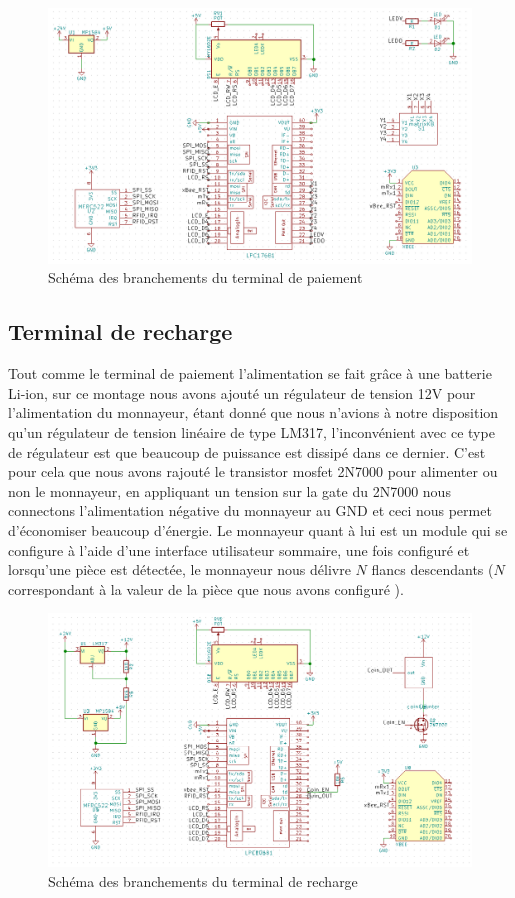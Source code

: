 	\begin{figure}[p]
		\includegraphics[width=\textwidth]{Pictures/Branchements/Terminal_Paiement}
		\caption{Schéma des branchements du terminal de paiement}
		\label{fig.branchPaiement}
	\end{figure}
		
	\subsection{Terminal de recharge}
	Tout comme le terminal de paiement l’alimentation se fait grâce à une batterie Li-ion, sur ce montage nous avons ajouté un régulateur de tension 12V pour l’alimentation du monnayeur, étant donné que nous n’avions à notre disposition qu’un régulateur de tension linéaire de type LM317, l'inconvénient avec ce type de régulateur est que beaucoup de puissance est dissipé dans ce dernier. C’est pour cela que nous avons rajouté le transistor mosfet 2N7000 pour alimenter ou non le monnayeur, en appliquant un tension sur la gate du 2N7000 nous connectons l’alimentation négative du monnayeur au GND et ceci nous permet d'économiser beaucoup d’énergie. Le monnayeur quant à lui est un module qui se configure à l’aide d’une interface utilisateur sommaire, une fois configuré et lorsqu’une pièce est détectée, le monnayeur nous délivre $N$  flancs descendants ($N$ correspondant à la valeur de la pièce que nous avons configuré ).

	\begin{figure}[p]
		\includegraphics[width=\textwidth]{Pictures/Branchements/Terminal_Recharge}
		\caption{Schéma des branchements du terminal de recharge}
		\label{fig.branchRecharge}
	\end{figure}

	
	